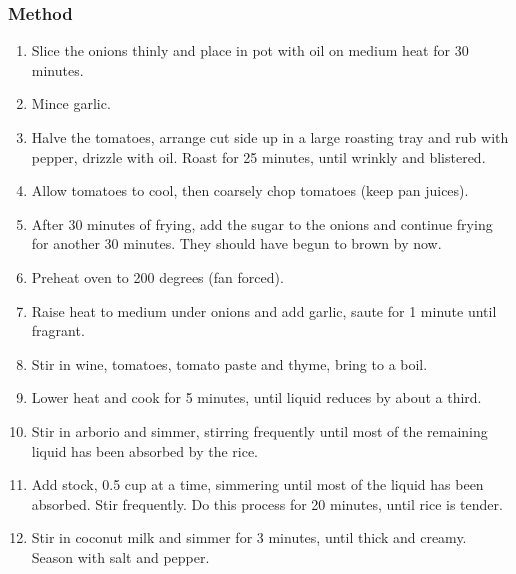 \documentclass[]{article}
\begin{document}
\subsubsection*{\Large Method}
\begin{enumerate}[font=\huge\color{accent}]
	\item Slice the onions thinly and place in pot with oil on medium heat for 30 minutes.
	\item Mince garlic.
	\item Halve the tomatoes, arrange cut side up in a large roasting tray and rub with pepper, drizzle with oil. Roast for 25 minutes, until wrinkly and blistered.
	\item Allow tomatoes to cool, then coarsely chop tomatoes (keep pan juices).
	\item After 30 minutes of frying, add the sugar to the onions and continue frying for another 30 minutes. They should have begun to brown by now.
	\item Preheat oven to 200 degrees (fan forced).
	\item Raise heat to medium under onions and add garlic, saute for 1 minute until fragrant.
	\item Stir in wine, tomatoes, tomato paste and thyme, bring to a boil.
	\item Lower heat and cook for 5 minutes, until liquid reduces by about a third.
	\item Stir in arborio and simmer, stirring frequently until most of the remaining liquid has been absorbed by the rice.
	\item Add stock, 0.5 cup at a time, simmering until most of the liquid has been absorbed. Stir frequently. Do this process for 20 minutes, until rice is tender.
	\item Stir in coconut milk and simmer for 3 minutes, until thick and creamy. Season with salt and pepper.
\end{enumerate}
\newpage
{}\label{rec:Chinese Fried Rice}
\end{document}
